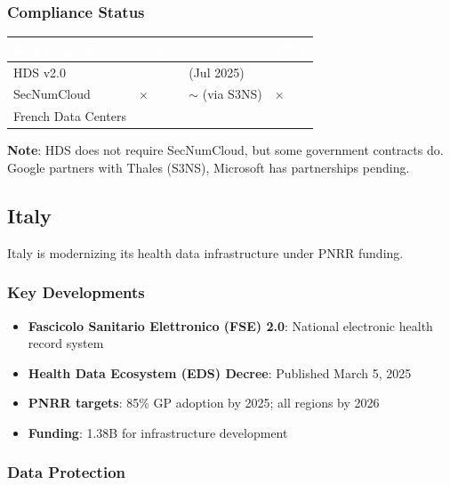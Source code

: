 \documentclass[11pt,a4paper]{article}
\newcommand{\compliant}{\textcolor{msgreen}{\checkmark}}
\newcommand{\partialcompliant}{\textcolor{msorange}{$\sim$}}
\newcommand{\notcompliant}{\textcolor{msred}{$\times$}}
\begin{document}
\subsubsection{Compliance Status}

\begin{center}
\begin{tabular}{L{3cm}C{2cm}C{2cm}C{2cm}}
\toprule
{}
\textcolor{white}{\textbf{Requirement}} & \textcolor{white}{\textbf{Azure}} & \textcolor{white}{\textbf{GCP}} & \textcolor{white}{\textbf{AWS}} \\
\midrule
HDS v2.0 & \compliant & \compliant{} (Jul 2025) & \compliant \\
SecNumCloud & \notcompliant & \partialcompliant{} (via S3NS) & \notcompliant \\
French Data Centers & \compliant & \compliant & \compliant \\
\bottomrule
\end{tabular}
\end{center}

\textbf{Note}: HDS does not require SecNumCloud, but some government contracts do. Google partners with Thales (S3NS), Microsoft has partnerships pending.

\subsection{Italy}

Italy is modernizing its health data infrastructure under PNRR funding.

\subsubsection{Key Developments}

\begin{itemize}
    \item \textbf{Fascicolo Sanitario Elettronico (FSE) 2.0}: National electronic health record system
    \item \textbf{Health Data Ecosystem (EDS) Decree}: Published March 5, 2025
    \item \textbf{PNRR targets}: 85\% GP adoption by 2025; all regions by 2026
    \item \textbf{Funding}: \texteuro1.38B for infrastructure development
\end{itemize}

\subsubsection{Data Protection}
\end{document}
